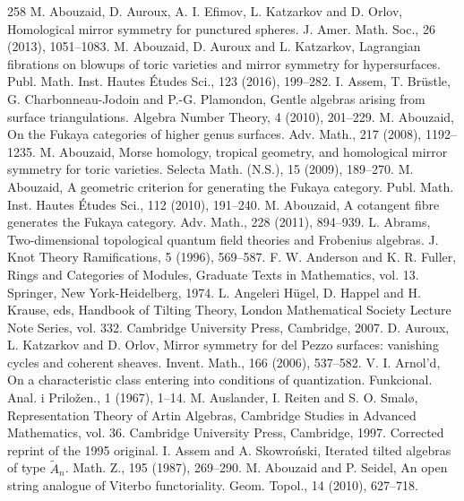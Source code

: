 \begin{thebibliography}{258}
\hypertarget{ref:1}{} M. Abouzaid, D. Auroux, A. I. Efimov, L. Katzarkov and D. Orlov, Homological mirror symmetry for punctured spheres. J. Amer. Math. Soc., 26 (2013), 1051–1083.
\hypertarget{ref:2}{} M. Abouzaid, D. Auroux and L. Katzarkov, Lagrangian fibrations on blowups of toric varieties and mirror symmetry for hypersurfaces. Publ. Math. Inst. Hautes Études Sci., 123 (2016), 199–282.
\hypertarget{ref:3}{} I. Assem, T. Brüstle, G. Charbonneau-Jodoin and P.-G. Plamondon, Gentle algebras arising from surface triangulations. Algebra Number Theory, 4 (2010), 201–229.
\hypertarget{ref:4}{} M. Abouzaid, On the Fukaya categories of higher genus surfaces. Adv. Math., 217 (2008), 1192–1235.
\hypertarget{ref:5}{} M. Abouzaid, Morse homology, tropical geometry, and homological mirror symmetry for toric varieties. Selecta Math. (N.S.), 15 (2009), 189–270.
\hypertarget{ref:6}{} M. Abouzaid, A geometric criterion for generating the Fukaya category. Publ. Math. Inst. Hautes Études Sci., 112 (2010), 191–240.
\hypertarget{ref:7}{} M. Abouzaid, A cotangent fibre generates the Fukaya category. Adv. Math., 228 (2011), 894–939.
\hypertarget{ref:8}{} L. Abrams, Two-dimensional topological quantum field theories and Frobenius algebras. J. Knot Theory Ramifications, 5 (1996), 569–587.
\hypertarget{ref:9}{} F. W. Anderson and K. R. Fuller, Rings and Categories of Modules, Graduate Texts in Mathematics, vol. 13. Springer, New York-Heidelberg, 1974.
\hypertarget{ref:10}{} L. Angeleri Hügel, D. Happel and H. Krause, eds, Handbook of Tilting Theory, London Mathematical Society Lecture Note Series, vol. 332. Cambridge University Press, Cambridge, 2007.
\hypertarget{ref:11}{} D. Auroux, L. Katzarkov and D. Orlov, Mirror symmetry for del Pezzo surfaces: vanishing cycles and coherent sheaves. Invent. Math., 166 (2006), 537–582.
\hypertarget{ref:12}{} V. I. Arnol’d, On a characteristic class entering into conditions of quantization. Funkcional. Anal. i Priložen., 1 (1967), 1–14.
\hypertarget{ref:13}{} M. Auslander, I. Reiten and S. O. Smalø, Representation Theory of Artin Algebras, Cambridge Studies in Advanced Mathematics, vol. 36. Cambridge University Press, Cambridge, 1997. Corrected reprint of the 1995 original.
\hypertarget{ref:14}{} I. Assem and A. Skowroński, Iterated tilted algebras of type $\widetilde{A}_n$. Math. Z., 195 (1987), 269–290.
\hypertarget{ref:15}{} M. Abouzaid and P. Seidel, An open string analogue of Viterbo functoriality. Geom. Topol., 14 (2010), 627–718.

\end{thebibliography}
